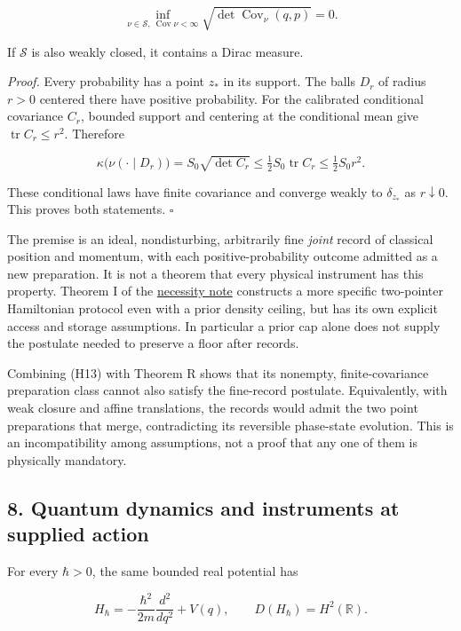 \documentclass[11pt,a4paper]{article}
\begin{document}
\[
 \inf_{\nu\in\mathcal S,\ \operatorname{Cov}\nu<\infty}
 \sqrt{\det\operatorname{Cov}_\nu(q,p)}=0. \tag{H13}
\]

If \(\mathcal S\) is also weakly closed, it contains a Dirac measure.

\emph{Proof.} Every probability has a point \(z_*\) in its support. The
balls \(D_r\) of radius \(r>0\) centered there have positive
probability. For the calibrated conditional covariance \(C_r\), bounded
support and centering at the conditional mean give
\(\operatorname{tr} C_r\le r^2\). Therefore

\[
 \kappa\bigl(\nu(\cdot\mid D_r)\bigr)
 =S_0\sqrt{\det C_r}\le\tfrac12 S_0\operatorname{tr}C_r
 \le\tfrac12S_0r^2. \tag{H14}
\]

These conditional laws have finite covariance and converge weakly to
\(\delta_{z_*}\) as \(r\downarrow0\). This proves both statements.
\(\square\)

The premise is an ideal, nondisturbing, arbitrarily fine \emph{joint}
record of classical position and momentum, with each
positive-probability outcome admitted as a new preparation. It is not a
theorem that every physical instrument has this property. Theorem I of
the \href{necessity-unit-and-indeterminacy.md}{necessity note}
constructs a more specific two-pointer Hamiltonian protocol even with a
prior density ceiling, but has its own explicit access and storage
assumptions. In particular a prior cap alone does not supply the
postulate needed to preserve a floor after records.

Combining (H13) with Theorem R shows that its nonempty,
finite-covariance preparation class cannot also satisfy the fine-record
postulate. Equivalently, with weak closure and affine translations, the
records would admit the two point preparations that merge, contradicting
its reversible phase-state evolution. This is an incompatibility among
assumptions, not a proof that any one of them is physically mandatory.

\hypertarget{quantum-dynamics-and-instruments-at-supplied-action}{%
\subsection{8. Quantum dynamics and instruments at supplied
action}\label{quantum-dynamics-and-instruments-at-supplied-action}}

For every \(\hbar>0\), the same bounded real potential has

\[
 H_\hbar=-\frac{\hbar^2}{2m}\frac{d^2}{dq^2}+V(q),\qquad
 D(H_\hbar)=H^2(\mathbb R).
 \tag{14}
\]
\end{document}
